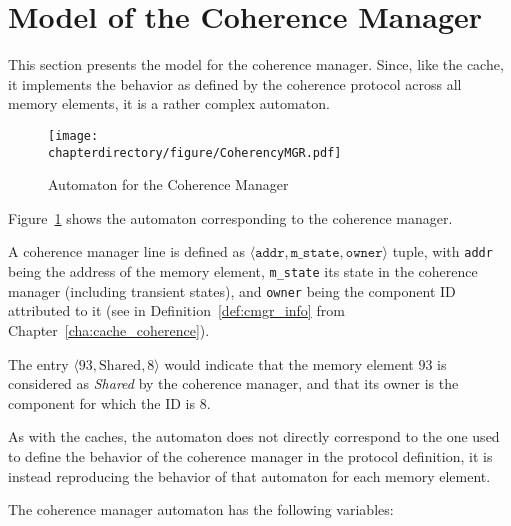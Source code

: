 \section{Model of the Coherence Manager}
\label{sec:model:cmgr}
This section presents the model for the coherence manager. Since, like the
cache, it implements the behavior as defined by the coherence protocol across
all memory elements, it is a rather complex automaton.

\begin{figure}[hbt!]
\begin{center}
\texttt{[image: \\chapterdirectory/figure/CoherencyMGR.pdf]}
\end{center}
\caption{Automaton for the Coherence Manager}
\label{fig:UPPAAL:CoherencyMGR}
\end{figure}

Figure~\ref{fig:UPPAAL:CoherencyMGR} shows the automaton corresponding to the
coherence manager.

\begin{definition}
A coherence manager line is defined as $\langle \texttt{addr},\allowbreak{}
\texttt{m\_state}, \texttt{owner} \rangle$ tuple, with \texttt{addr} being the
address of the memory element, \texttt{m\_state} its state in the coherence
manager (including transient states), and \texttt{owner} being the component ID
attributed to it (see \coherencemanagerownerfun{} in
Definition~\ref{def:cmgr_info} from Chapter~\ref{cha:cache_coherence}).
\end{definition}
\begin{example}
The entry $\langle 93, \text{Shared}, 8\rangle$ would indicate that the memory
element $93$ is considered as \textit{Shared} by the coherence manager, and that
its owner is the component for which the ID is $8$.
\end{example}

As with the caches, the automaton does not directly correspond to the one used
to define the behavior of the coherence manager in the protocol definition, it
is instead reproducing the behavior of that automaton for each memory element.

The coherence manager automaton has the following variables:
